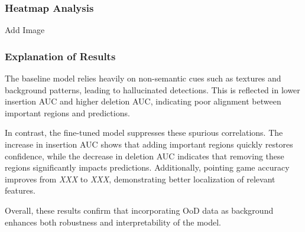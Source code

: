 \subsubsection{Heatmap Analysis}
Add Image

\subsubsection{Explanation of Results}
The baseline model relies heavily on non-semantic cues such as textures and background patterns, leading to hallucinated detections. This is reflected in lower insertion AUC and higher deletion AUC, indicating poor alignment between important regions and predictions.

In contrast, the fine-tuned model suppresses these spurious correlations. The increase in insertion AUC shows that adding important regions quickly restores confidence, while the decrease in deletion AUC indicates that removing these regions significantly impacts predictions. Additionally, pointing game accuracy improves from \textit{XXX} to \textit{XXX}, demonstrating better localization of relevant features.

Overall, these results confirm that incorporating OoD data as background enhances both robustness and interpretability of the model.